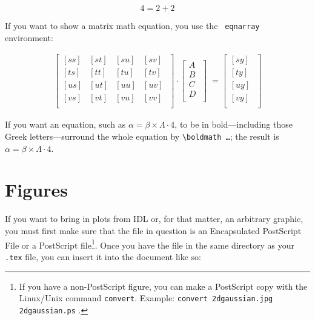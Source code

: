 \documentclass[12pt,preprint]{aastex}
\begin{document}
$$     4 = 2 + 2  $$

\noindent If you want to show a matrix math equation, you use the {\tt
  eqnarray} environment:

\begin{eqnarray} \label{smeqn}
\left[
\begin{array}{cccc}
{[ ss ]} & {[ st ]} & {[ su ]} & {[ sv ]} \\
{[ ts ]} & {[ tt ]} & {[ tu ]} & {[ tv ]} \\
{[ us ]} & {[ ut ]} & {[ uu ]} & {[ uv ]} \\
{[ vs ]} & {[ vt ]} & {[ vu ]} & {[ vv ]} \\
\end{array}
\; \right] 
\cdot
\left[
\begin{array}{c}
A \\
B \\
C \\
D \\
\end{array}
\; \right]
\; =
\left[
\begin{array}{c}
{[ s y ]} \\
{[ t y ]} \\
{[ u y ]} \\
{[ v y ]} \\
\end{array}
\; \right]
\end{eqnarray}

If you want an equation, such as $\alpha = \beta \times \Lambda \cdot
4$, to be in bold---including those Greek letters---surround the whole
equation by {\tt \verb&\&boldmath \dots }; the result is 
{\boldmath $\alpha = \beta \times \Lambda \cdot 4$}.

\section{Figures}\label{figsec}

If you want to bring in plots from IDL or, for that matter, an arbitrary
graphic, you must first make sure that the file in question is an
Encapsulated PostScript File or a PostScript file\footnote{If you have a
  non-PostScript figure, you can make a PostScript copy with the
  Linux/Unix command {\tt convert}. Example: {\tt convert 2dgaussian.jpg
    2dgaussian.ps} .}.  Once you have the file in the same directory as
your \verb&.tex& file, you can insert it into the document like so:
\end{document}
